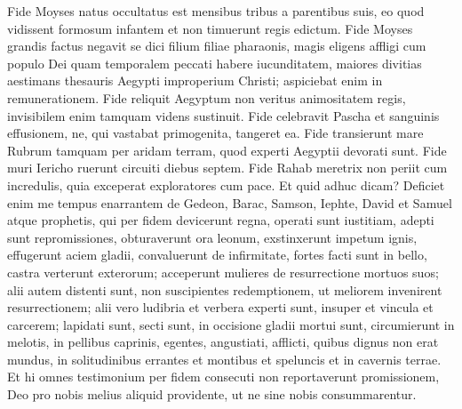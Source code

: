 \begin{biblechapter}
\verse Fide Moyses natus occultatus est mensibus tribus a parentibus suis, eo quod vidissent formosum infantem et non timuerunt regis edictum. 
\verse Fide Moyses grandis factus negavit se dici filium filiae pharaonis, 
\verse magis eligens affligi cum populo Dei quam temporalem peccati habere iucunditatem, 
\verse maiores divitias aestimans thesauris Aegypti improperium Christi; aspiciebat enim in remunerationem. 
\verse Fide reliquit Aegyptum non veritus animositatem regis, invisibilem enim tamquam videns sustinuit. 
\verse Fide celebravit Pascha et sanguinis effusionem, ne, qui vastabat primogenita, tangeret ea. 
\verse Fide transierunt mare Rubrum tamquam per aridam terram, quod experti Aegyptii devorati sunt. 
\verse Fide muri Iericho ruerunt circuiti diebus septem. 
\verse Fide Rahab meretrix non periit cum incredulis, quia exceperat exploratores cum pace. 
\verse Et quid adhuc dicam? Deficiet enim me tempus enarrantem de Gedeon, Barac, Samson, Iephte, David et Samuel atque prophetis, 
\verse qui per fidem devicerunt regna, operati sunt iustitiam, adepti sunt repromissiones, obturaverunt ora leonum, 
\verse exstinxerunt impetum ignis, effugerunt aciem gladii, convaluerunt de infirmitate, fortes facti sunt in bello, castra verterunt exterorum; 
\verse acceperunt mulieres de resurrectione mortuos suos; alii autem distenti sunt, non suscipientes redemptionem, ut meliorem invenirent resurrectionem; 
\verse alii vero ludibria et verbera experti sunt, insuper et vincula et carcerem; 
\verse lapidati sunt, secti sunt, in occisione gladii mortui sunt, circumierunt in melotis, in pellibus caprinis, egentes, angustiati, afflicti, 
\verse quibus dignus non erat mundus, in solitudinibus errantes et montibus et speluncis et in cavernis terrae. 
\verse Et hi omnes testimonium per fidem consecuti non reportaverunt promissionem, 
\verse Deo pro nobis melius aliquid providente, ut ne sine nobis consummarentur. 
\end{biblechapter}

